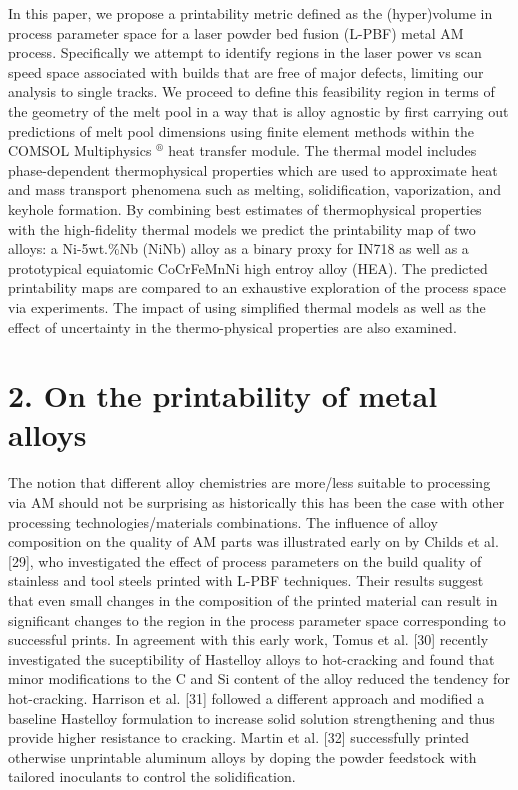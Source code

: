 \documentclass[10pt]{article}
\begin{document}
In this paper, we propose a printability metric defined as the (hyper)volume in process parameter space for a laser powder bed fusion (L-PBF) metal AM process. Specifically we attempt to identify regions in the laser power vs scan speed space associated with builds that are free of major defects, limiting our analysis to single tracks. We proceed to define this feasibility region in terms of the geometry of the melt pool in a way that is alloy agnostic by first carrying out predictions of melt pool dimensions using finite element methods within the COMSOL Multiphysics ${ }^{\circledR}$ heat transfer module. The thermal model includes phase-dependent thermophysical properties which are used to approximate heat and mass transport phenomena such as melting, solidification, vaporization, and keyhole formation. By combining best estimates of thermophysical properties with the high-fidelity thermal models we predict the printability map of two alloys: a Ni-5wt.\%Nb (NiNb) alloy as a binary proxy for IN718 as well as a prototypical equiatomic CoCrFeMnNi high entroy alloy (HEA). The predicted printability maps are compared to an exhaustive exploration of the process space via experiments. The impact of using simplified thermal models as well as the effect of uncertainty in the thermo-physical properties are also examined.

\section*{2. On the printability of metal alloys}
The notion that different alloy chemistries are more/less suitable to processing via AM should not be surprising as historically this has been the case with other processing technologies/materials combinations. The influence of alloy composition on the quality of AM parts was illustrated early on by Childs et al. [29], who investigated the effect of process parameters on the build quality of stainless and tool steels printed with L-PBF techniques. Their results suggest that even small changes in the composition of the printed material can result in significant changes to the region in the process parameter space corresponding to successful prints. In agreement with this early work, Tomus et al. [30] recently investigated the suceptibility of Hastelloy alloys to hot-cracking and found that minor modifications to the $\mathrm{C}$ and Si content of the alloy reduced the tendency for hot-cracking. Harrison et al. [31] followed a different approach and modified a baseline Hastelloy formulation to increase solid solution strengthening and thus provide higher resistance to cracking. Martin et al. [32] successfully printed otherwise unprintable aluminum alloys by doping the powder feedstock with tailored inoculants to control the solidification.
\end{document}
